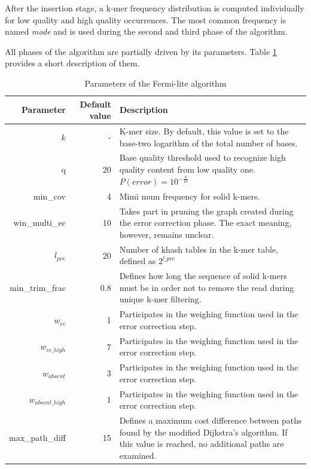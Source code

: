 After the insertion stage, a k-mer frequency distribution is computed individually for low quality and high quality occurrences. The most common frequency is named \textit{mode} and is used during the second and third phase of the algorithm.

All phases of the algorithm are partially driven by its parameters. Table \ref{tab:fermi-parameters} provides a short description of them.

\begin{table}[h]
\begin{center}
\caption{Parameters of the Fermi-lite algorithm}
\label{tab:fermi-parameters}
\begin{tabular}{| r | r | p{5cm} |}
\hline
Parameter & Default value & Description \\
\hline
$k$ & - & K-mer size. By default, this value is set to the base-two logarithm of the total number of bases. \\
\hline
q & 20 & Base quality threshold used to recognize high quality content from low quality one. $P(error) = 10^{-\frac{q}{10}}$ \\
\hline
min\_cov & 4 & Mimi mum frequency for solid k-mers. \\
\hline
win\_multi\_ec & 10 & Takes part in pruning the graph created during the error correction phase. The exact meaning, however, remains unclear. \\
\hline
$l_{pre}$ & 20 & Number of khash tables in the k-mer table, defined as $2^{l\_pre}$ \\
\hline
min\_trim\_frac & 0.8 &  Defines how long the sequence of solid k-mers must be in order not to remove the read during unique k-mer filtering. \\
\hline
$w_{ec}$ & 1 & Participates in the weighing function used in the error correction step.\\
\hline
$w_{ec\_high}$ & 7 & Participates in the weighing function used in the error correction step. \\
\hline
$w_{absent}$ & 3 & Participates in the weighing function used in the error correction step. \\
\hline
$w_{absent\_high}$ & 1 & Participates in the weighing function used in the error correction step. \\ 
\hline
max\_path\_diff & 15 & Defines a maximum cost difference between paths found by the modified Dijkstra's algorithm. If this value is reached, no additional paths are examined. \\ 
\hline
\end{tabular}
\end{center}
\end{table}

